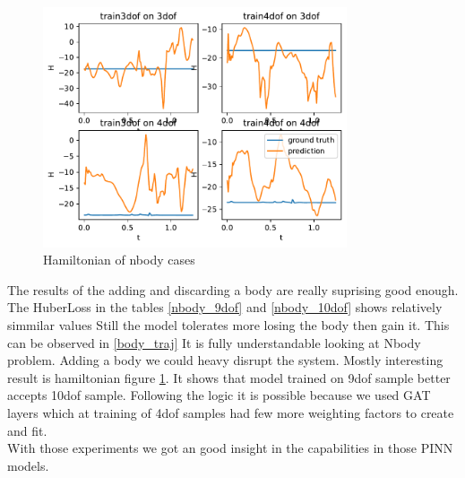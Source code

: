 \begin{figure}[htbp]
	\centering
	\includegraphics[width=0.8\textwidth]{chapters/chapter5/nbody_hamiltonian.pdf} %
	\caption{Hamiltonian of nbody cases}
	\label{nbody_ham}
\end{figure}

The results of the adding and discarding a body are really suprising good enough. The HuberLoss in the tables \ref{nbody_9dof} and \ref{nbody_10dof} shows relatively simmilar values Still the model tolerates more losing the body then gain it. This can be observed in \ref{body_traj} It is fully understandable looking at Nbody problem. Adding a body we could heavy disrupt the system.
Mostly interesting result is hamiltonian figure \ref{nbody_ham}. It shows that model trained on 9dof sample better accepts 10dof sample. Following the logic it is possible because we used GAT layers which at training of 4dof samples had few more weighting factors to create and fit. \\
With those experiments we got an good insight in the capabilities in those PINN models.